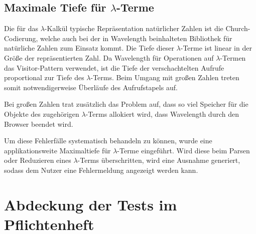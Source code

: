 \documentclass[parskip=full,11pt,openany]{scrreprt}
\begin{document}
\subsection{Maximale Tiefe für $\lambda$-Terme}
Die für das $\lambda$-Kalkül typische Repräsentation natürlicher Zahlen ist die
Church-Codierung, welche auch bei der in Wavelength beinhalteten Bibliothek für
natürliche Zahlen zum Einsatz kommt. Die Tiefe dieser $\lambda$-Terme ist linear
in der Größe der repräsentierten Zahl. Da Wavelength für Operationen auf
$\lambda$-Termen das Visitor-Pattern verwendet, ist die Tiefe der
verschachtelten Aufrufe proportional zur Tiefe des $\lambda$-Terms. Beim Umgang mit großen
Zahlen treten somit notwendigerweise Überläufe des Aufrufstapels auf.

Bei großen Zahlen trat zusätzlich das Problem auf, dass so viel Speicher für
die Objekte des zugehörigen $\lambda$-Terms allokiert wird, dass Wavelength
durch den Browser beendet wird.

Um diese Fehlerfälle systematisch behandeln zu können, wurde eine applikationsweite
Maximaltiefe für $\lambda$-Terme eingeführt. Wird diese beim Parsen oder Reduzieren
eines $\lambda$-Terms überschritten, wird eine Ausnahme generiert, sodass dem
Nutzer eine Fehlermeldung angezeigt werden kann.

\section{Abdeckung der Tests im Pflichtenheft}

\end{document}
